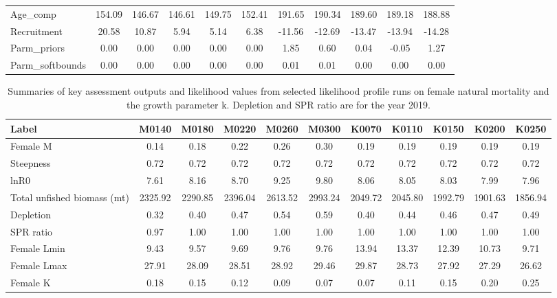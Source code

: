 \documentclass[12pt,]{article}
\begin{document}
\begin{landscape}
\begin{table}[ht]
\begin{tabular}{l|ccccc|ccccc}
  Age\_comp & 154.09 & 146.67 & 146.61 & 149.75 & 152.41 & 191.65 & 190.34 & 189.60 & 189.18 & 188.88 \\ 
  Recruitment & 20.58 & 10.87 & 5.94 & 5.14 & 6.38 & -11.56 & -12.69 & -13.47 & -13.94 & -14.28 \\ 
  Parm\_priors & 0.00 & 0.00 & 0.00 & 0.00 & 0.00 & 1.85 & 0.60 & 0.04 & -0.05 & 1.27 \\ 
  Parm\_softbounds & 0.00 & 0.00 & 0.00 & 0.00 & 0.00 & 0.01 & 0.01 & 0.00 & 0.00 & 0.00 \\ 
   \hline
\end{tabular}
\end{table}
\begin{table}[ht]
\centering
\caption{Summaries of key assessment outputs 
                                              and likelihood values from selected 
                                              likelihood profile runs on female 
                                              natural mortality and the growth parameter k.  
                                              Depletion and SPR ratio 
                                              are for the year 2019.} 
\label{tab:like_profiles2}
\begin{tabular}{l|ccccc|ccccc}
  \hline
Label & M0140 & M0180 & M0220 & M0260 & M0300 & K0070 & K0110 & K0150 & K0200 & K0250 \\ 
  \hline
Female M & 0.14 & 0.18 & 0.22 & 0.26 & 0.30 & 0.19 & 0.19 & 0.19 & 0.19 & 0.19 \\ 
  Steepness & 0.72 & 0.72 & 0.72 & 0.72 & 0.72 & 0.72 & 0.72 & 0.72 & 0.72 & 0.72 \\ 
  lnR0 & 7.61 & 8.16 & 8.70 & 9.25 & 9.80 & 8.06 & 8.05 & 8.03 & 7.99 & 7.96 \\ 
  Total unfished biomass (mt) & 2325.92 & 2290.85 & 2396.04 & 2613.52 & 2993.24 & 2049.72 & 2045.80 & 1992.79 & 1901.63 & 1856.94 \\ 
  Depletion & 0.32 & 0.40 & 0.47 & 0.54 & 0.59 & 0.40 & 0.44 & 0.46 & 0.47 & 0.49 \\ 
  SPR ratio & 0.97 & 1.00 & 1.00 & 1.00 & 1.00 & 1.00 & 1.00 & 1.00 & 1.00 & 1.00 \\ 
  Female Lmin & 9.43 & 9.57 & 9.69 & 9.76 & 9.76 & 13.94 & 13.37 & 12.39 & 10.73 & 9.71 \\ 
  Female Lmax & 27.91 & 28.09 & 28.51 & 28.92 & 29.46 & 29.87 & 28.73 & 27.92 & 27.29 & 26.62 \\ 
  Female K & 0.18 & 0.15 & 0.12 & 0.09 & 0.07 & 0.07 & 0.11 & 0.15 & 0.20 & 0.25 \\ 

\end{tabular}
\end{table}
\end{landscape}
\end{document}
